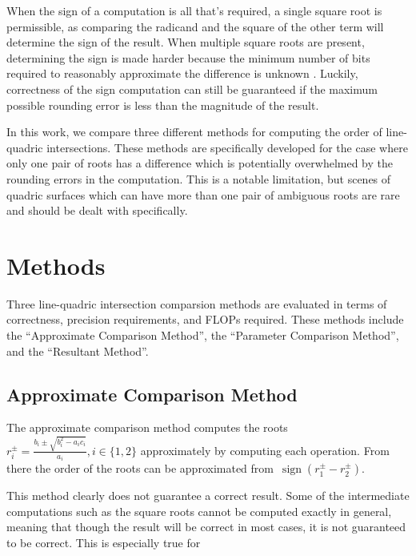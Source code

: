 \documentclass{cccg16}
\DeclareMathOperator{\sign}{sign}
\begin{document}
When the sign of a computation is all that's required, a single square
root is permissible, as comparing the radicand and the square of the
other term will determine the sign of the result.
When multiple square roots are present, determining the sign is made
harder because the minimum number of bits required to reasonably
approximate the difference is unknown \cite{demaine33open}.  Luckily,
correctness of the sign computation can still be guaranteed if the
maximum possible rounding error is less than the magnitude of the
result.

In this work, we compare three different methods for computing the
order of line-quadric intersections.  These methods are specifically
developed for the case where only one pair of roots has a difference
which is potentially overwhelmed by the rounding errors in the
computation.  This is a notable limitation, but scenes of quadric
surfaces which can have more than one pair of ambiguous roots are rare
and should be dealt with specifically.

\section{Methods}
Three line-quadric intersection comparsion methods are evaluated in
terms of correctness, precision requirements, and FLOPs required.
These methods include the ``Approximate Comparison Method'', the
``Parameter Comparison Method'', and the ``Resultant Method''.

\subsection{Approximate Comparison Method}
The approximate comparison method computes the
roots~$r_i^\pm=\frac{b_i\pm\sqrt{b_i^2-a_ic_i}}{a_i}, i\in\{1, 2\}$
approximately by computing each operation.  From there the order of
the roots can be approximated from~$\sign(r_1^\pm-r_2^\pm)$.

This method clearly does not guarantee a correct result.  Some of the
intermediate computations such as the square roots cannot be computed
exactly in general, meaning that though the result will be correct in
most cases, it is not guaranteed to be correct.  This is especially
true for
\end{document}
